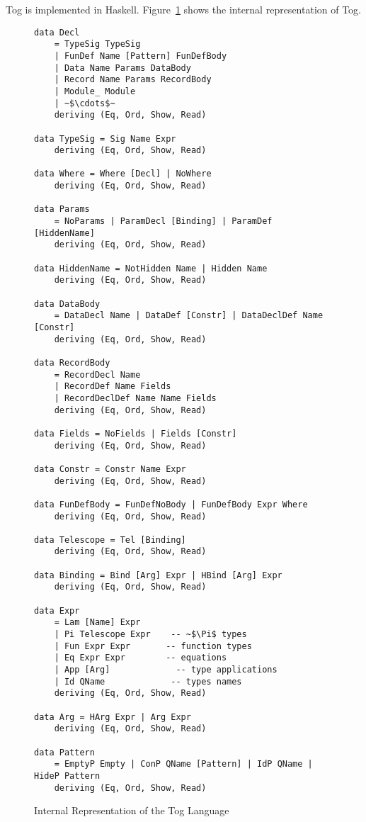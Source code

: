 Tog is implemented in Haskell. Figure~\ref{fig:togRepr} shows the internal representation of Tog. 
\begin{figure}
\begin{verbatim}
data Decl
    = TypeSig TypeSig
    | FunDef Name [Pattern] FunDefBody
    | Data Name Params DataBody
    | Record Name Params RecordBody
    | Module_ Module
    | ~$\cdots$~
    deriving (Eq, Ord, Show, Read)

data TypeSig = Sig Name Expr
    deriving (Eq, Ord, Show, Read)

data Where = Where [Decl] | NoWhere
    deriving (Eq, Ord, Show, Read)

data Params
    = NoParams | ParamDecl [Binding] | ParamDef [HiddenName]
    deriving (Eq, Ord, Show, Read)

data HiddenName = NotHidden Name | Hidden Name
    deriving (Eq, Ord, Show, Read)

data DataBody
    = DataDecl Name | DataDef [Constr] | DataDeclDef Name [Constr]
    deriving (Eq, Ord, Show, Read)

data RecordBody
    = RecordDecl Name
    | RecordDef Name Fields
    | RecordDeclDef Name Name Fields
    deriving (Eq, Ord, Show, Read)

data Fields = NoFields | Fields [Constr]
    deriving (Eq, Ord, Show, Read)

data Constr = Constr Name Expr
    deriving (Eq, Ord, Show, Read)

data FunDefBody = FunDefNoBody | FunDefBody Expr Where
    deriving (Eq, Ord, Show, Read)

data Telescope = Tel [Binding]
    deriving (Eq, Ord, Show, Read)

data Binding = Bind [Arg] Expr | HBind [Arg] Expr
    deriving (Eq, Ord, Show, Read)

data Expr
    = Lam [Name] Expr
    | Pi Telescope Expr    -- ~$\Pi$ types 
    | Fun Expr Expr       -- function types  
    | Eq Expr Expr        -- equations 
    | App [Arg]             -- type applications 
    | Id QName             -- types names
    deriving (Eq, Ord, Show, Read)

data Arg = HArg Expr | Arg Expr
    deriving (Eq, Ord, Show, Read)

data Pattern
    = EmptyP Empty | ConP QName [Pattern] | IdP QName | HideP Pattern
    deriving (Eq, Ord, Show, Read)
\end{verbatim}
\caption{Internal Representation of the Tog Language}
\label{fig:togRepr}
\end{figure}

